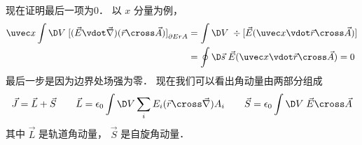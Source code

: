 现在证明最后一项为0． 以 $x$ 分量为例，
\begin{equation}
\begin{aligned}
  \uvec x\int {\D V\;{{[(\vec E \vdot \vec\nabla )(\vec r \cross \vec A)]}_{\partial ErA}}}  &= \int {\D V\; \div [\vec E(\uvec x \vdot \vec r \cross \vec A) ]} \\
  &= \oint {\D \vec s\;\vec E(\uvec x \vdot \vec r \cross \vec A)}  = 0
\end{aligned}
\end{equation}
最后一步是因为边界处场强为零． 现在我们可以看出角动量由两部分组成
\begin{equation}
\vec J = \vec L + \vec S
\qquad
\vec L = {\epsilon_0}\int {\D V\sum\limits_i {{E_i}} (\vec r \cross \vec\nabla ){A_i}}
\qquad
\vec S = {\epsilon_0}\int {\D V\;\vec E \cross \vec A} 
\end{equation}
其中 $\vec L$ 是轨道角动量， $\vec S$ 是自旋角动量．
